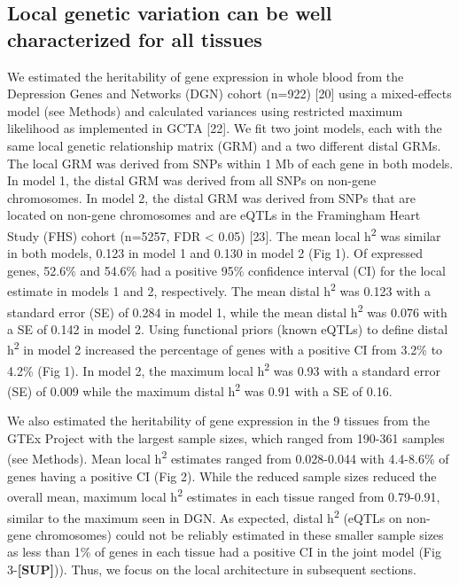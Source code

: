 \documentclass[]{article}
\begin{document}
\subsection{Local genetic variation can be well characterized for all
tissues}\label{local-genetic-variation-can-be-well-characterized-for-all-tissues}

We estimated the heritability of gene expression in whole blood from the
Depression Genes and Networks (DGN) cohort (n=922) {[}20{]} using a
mixed-effects model (see Methods) and calculated variances using
restricted maximum likelihood as implemented in GCTA {[}22{]}. We fit
two joint models, each with the same local genetic relationship matrix
(GRM) and a two different distal GRMs. The local GRM was derived from
SNPs within 1 Mb of each gene in both models. In model 1, the distal GRM
was derived from all SNPs on non-gene chromosomes. In model 2, the
distal GRM was derived from SNPs that are located on non-gene
chromosomes and are eQTLs in the Framingham Heart Study (FHS) cohort
(n=5257, FDR \textless{} 0.05) {[}23{]}. The mean local
h\textsuperscript{2} was similar in both models, 0.123 in model 1 and
0.130 in model 2 (Fig 1). Of expressed genes, 52.6\% and 54.6\% had a
positive 95\% confidence interval (CI) for the local estimate in models
1 and 2, respectively. The mean distal h\textsuperscript{2} was 0.123
with a standard error (SE) of 0.284 in model 1, while the mean distal
h\textsuperscript{2} was 0.076 with a SE of 0.142 in model 2. Using
functional priors (known eQTLs) to define distal h\textsuperscript{2} in
model 2 increased the percentage of genes with a positive CI from 3.2\%
to 4.2\% (Fig 1). In model 2, the maximum local h\textsuperscript{2} was
0.93 with a standard error (SE) of 0.009 while the maximum distal
h\textsuperscript{2} was 0.91 with a SE of 0.16.

We also estimated the heritability of gene expression in the 9 tissues
from the GTEx Project with the largest sample sizes, which ranged from
190-361 samples (see Methods). Mean local h\textsuperscript{2} estimates
ranged from 0.028-0.044 with 4.4-8.6\% of genes having a positive CI
(Fig 2). While the reduced sample sizes reduced the overall mean,
maximum local h\textsuperscript{2} estimates in each tissue ranged from
0.79-0.91, similar to the maximum seen in DGN. As expected, distal
h\textsuperscript{2} (eQTLs on non-gene chromosomes) could not be
reliably estimated in these smaller sample sizes as less than 1\% of
genes in each tissue had a positive CI in the joint model (Fig
3-\textbf{{[}SUP{]}})). Thus, we focus on the local architecture in
subsequent sections.
\end{document}
